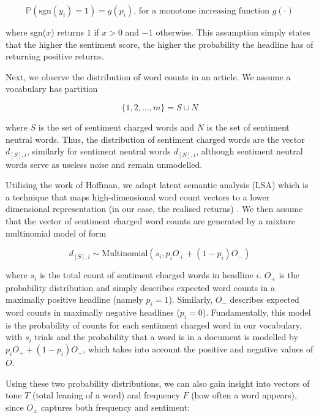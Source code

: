 \begin{equation}
\mathbb{P}(\text{sgn}(y_i) = 1) = g(p_i) \text{, for a monotone increasing function } g(\cdot)
\end{equation}

\noindent
where sgn($x$) returns $1$ if $x > 0$ and $-1$ otherwise. This assumption simply states that the higher the sentiment score, the higher the probability the headline has of returning positive returns.

Next, we observe the distribution of word counts in an article. We assume a vocabulary has partition

\begin{equation}
\{1,2,\dots,m\} = S \cup N
\end{equation}

\noindent
where $S$ is the set of sentiment charged words and $N$ is the set of sentiment neutral words. Thus, the distribution of sentiment charged words are the vector $d_{[S],i}$, similarly for sentiment neutral words $d_{[N],i}$, although sentiment neutral words serve as useless noise and remain unmodelled.

Utilising the work of Hoffman, we adapt latent semantic analysis (LSA) which is a technique that maps high-dimensional word count vectors to a lower dimensional representation (in our case, the realised returns) \cite{lsa}. We then assume that the vector of sentiment charged word counts are generated by a mixture multinomial model of form

\begin{equation}
d_{[S],i} \sim \text{Multinomial}(s_i, p_iO_+ + (1-p_i)O_-)
\label{multinom}
\end{equation}

\noindent
where $s_i$ is the total count of sentiment charged words in headline $i$. $O_+$ is the probability distribution and simply describes expected word counts in a maximally positive headline (namely $p_i = 1$). Similarly, $O_-$ describes expected word counts in maximally negative headlines ($p_i = 0$). Fundamentally, this model is the probability of counts for each sentiment charged word in our vocabulary, with $s_i$ trials and the probability that a word is in a document is modelled by $p_iO_+ + (1-p_i)O_-$, which takes into account the positive and negative values of $O$.

Using these two probability distributions, we can also gain insight into vectors of tone $T$ (total leaning of a word) and frequency $F$ (how often a word appears), since $O_\pm$ captures both frequency and sentiment:

